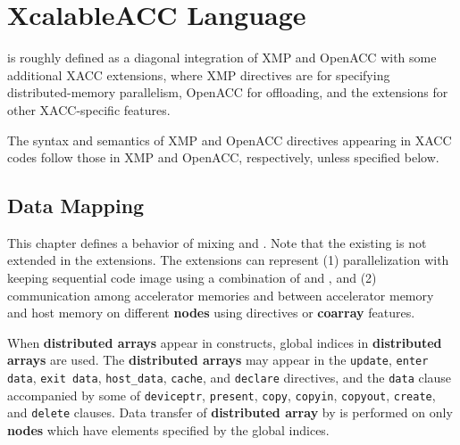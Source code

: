 \section{XcalableACC Language}

{\XACC} is roughly defined as a diagonal integration of XMP
and OpenACC with some additional XACC extensions, where XMP directives
are for specifying distributed-memory parallelism, OpenACC for
offloading, and the extensions for other XACC-specific features.

The syntax and semantics of XMP and OpenACC directives appearing in XACC
codes follow those in XMP and OpenACC, respectively, unless specified
below.

\subsection{Data Mapping}

This chapter defines a behavior of mixing {\XMP} and {\OACC}.
Note that the existing {\OACC} is not extended in the {\XMP} extensions.
The {\XMP} extensions can represent 
(1) parallelization with keeping sequential code image using a
combination of {\XMP} and {\OACC}, 
and
(2) communication among accelerator memories and between accelerator
memory and host memory on different {\bf nodes}
using {\XACC} directives or {\bf coarray} features.




When {\bf distributed arrays} appear in {\OACC} constructs,
global indices in {\bf distributed arrays} are used.
The {\bf distributed arrays} may appear in the {\tt update}, {\tt enter
data}, {\tt exit data}, 
{\tt host\_data}, {\tt cache}, and {\tt declare} directives,
and the {\tt data} clause accompanied by some of 
{\tt deviceptr}, {\tt present}, {\tt copy}, {\tt copyin}, 
{\tt copyout}, {\tt create}, and {\tt delete} clauses.
Data transfer of {\bf distributed array} by {\OACC} is performed on only
{\bf nodes} which have elements specified by the global indices.


